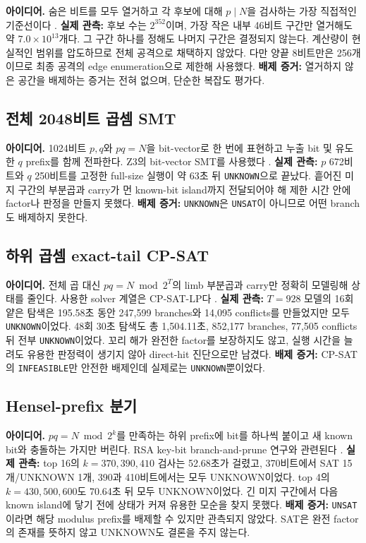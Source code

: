 \documentclass[10pt,a4paper]{article}
\newcommand{\evidence}[1]{\textbf{배제 증거:} #1}
\newcommand{\observed}[1]{\textbf{실제 관측:} #1}
\begin{document}
\textbf{아이디어.} 숨은 비트를 모두 열거하고 각 후보에 대해 \(p\mid N\)을
검사하는 가장 직접적인 기준선이다 \cite{rsa}.
\observed{후보 수는 \(2^{352}\)이며, 가장 작은 내부 46비트 구간만
열거해도 약 \(7.0\times10^{13}\)개다. 그 구간 하나를 정해도 나머지
구간은 결정되지 않는다.}
계산량이 현실적인 범위를 압도하므로 전체 공격으로 채택하지 않았다.
다만 양끝 8비트만은 256개이므로 최종 공격의 edge enumeration으로
제한해 사용했다.
\evidence{열거하지 않은 공간을 배제하는 증거는 전혀 없으며, 단순한
복잡도 평가다.}

\subsection{전체 2048비트 곱셈 SMT}

\textbf{아이디어.} 1024비트 \(p,q\)와 \(pq=N\)을 bit-vector로 한 번에
표현하고 누출 bit 및 유도한 \(q\) prefix를 함께 전파한다. Z3의 bit-vector
SMT를 사용했다 \cite{z3}.
\observed{\(p\) 672비트와 \(q\) 250비트를 고정한 full-size 실행이 약
63초 뒤 \texttt{UNKNOWN}으로 끝났다.}
흩어진 미지 구간의 부분곱과 carry가 먼 known-bit island까지 전달되어야
해 제한 시간 안에 factor나 판정을 만들지 못했다.
\evidence{\texttt{UNKNOWN}은 \texttt{UNSAT}이 아니므로 어떤 branch도
배제하지 못한다.}

\subsection{하위 곱셈 exact-tail CP-SAT}

\textbf{아이디어.} 전체 곱 대신 \(pq=N\bmod2^T\)의 limb 부분곱과 carry만
정확히 모델링해 상태를 줄인다. 사용한 solver 계열은 CP-SAT-LP다
\cite{cp-sat}.
\observed{\(T=928\) 모델의 16회 얕은 탐색은 195.58초 동안
247,599 branches와 14,095 conflicts를 만들었지만 모두
\texttt{UNKNOWN}이었다. 48회 30초 탐색도 총 1,504.11초,
852,177 branches, 77,505 conflicts 뒤 전부 \texttt{UNKNOWN}이었다.}
꼬리 해가 완전한 factor를 보장하지도 않고, 실행 시간을 늘려도 유용한
판정력이 생기지 않아 direct-hit 진단으로만 남겼다.
\evidence{CP-SAT의 \texttt{INFEASIBLE}만 안전한 배제인데 실제로는
\texttt{UNKNOWN}뿐이었다.}

\subsection{Hensel-prefix 분기}

\textbf{아이디어.} \(pq=N\bmod2^k\)를 만족하는 하위 prefix에 bit를 하나씩
붙이고 새 known bit와 충돌하는 가지만 버린다. RSA key-bit
branch-and-prune 연구와 관련된다 \cite{heninger-shacham}.
\observed{top 16의 \(k=370,390,410\) 검사는 52.68초가 걸렸고,
370비트에서 SAT 15개/UNKNOWN 1개, 390과 410비트에서는 모두
UNKNOWN이었다. top 4의 \(k=430,500,600\)도 70.64초 뒤 모두
UNKNOWN이었다.}
긴 미지 구간에서 다음 known island에 닿기 전에 상태가 커져 유용한
모순을 찾지 못했다.
\evidence{\texttt{UNSAT}이라면 해당 modulus prefix를 배제할 수 있지만
관측되지 않았다. SAT은 완전 factor의 존재를 뜻하지 않고 UNKNOWN도
결론을 주지 않는다.}
\end{document}
